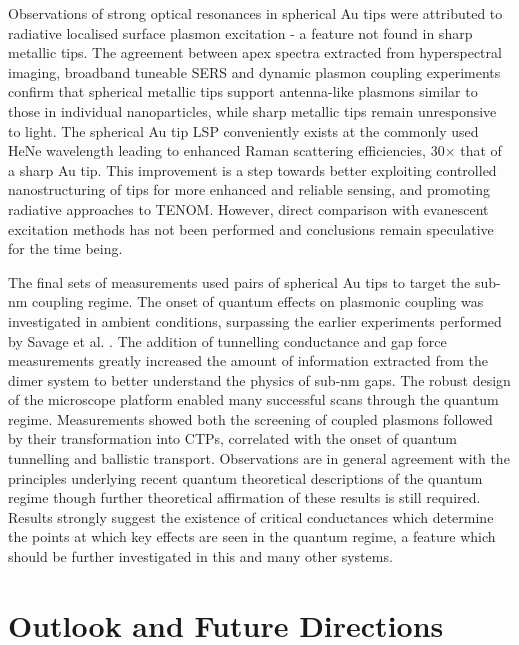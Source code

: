 \documentclass[12pt, a4paper, oneside]{book}
\begin{document}
Observations of strong optical resonances in spherical Au tips were attributed to radiative localised surface plasmon excitation - a feature not found in sharp metallic tips. The agreement between apex spectra extracted from hyperspectral imaging, broadband tuneable SERS and dynamic plasmon coupling experiments confirm that spherical metallic tips support antenna-like plasmons similar to those in individual nanoparticles, while sharp metallic tips remain unresponsive to light. The spherical Au tip LSP conveniently exists at the commonly used HeNe wavelength leading to enhanced Raman scattering efficiencies, 30$\times$ that of a sharp Au tip. This improvement is a step towards better exploiting controlled nanostructuring of tips for more enhanced and reliable sensing, and promoting radiative approaches to TENOM. However, direct comparison with evanescent excitation methods has not been performed and conclusions remain speculative for the time being.

The final sets of measurements used pairs of spherical Au tips to target the sub-nm coupling regime. The onset of quantum effects on plasmonic coupling was investigated in ambient conditions, surpassing the earlier experiments performed by Savage et al. \cite{savage2012}. The addition of tunnelling conductance and gap force measurements greatly increased the amount of information extracted from the dimer system to better understand the physics of sub-nm gaps. The robust design of the microscope platform enabled many successful scans through the quantum regime. Measurements showed both the screening of coupled plasmons followed by their transformation into CTPs, correlated with the onset of quantum tunnelling and ballistic transport. Observations are in general agreement with the principles underlying recent quantum theoretical descriptions of the quantum regime though further theoretical affirmation of these results is still required. Results strongly suggest the existence of critical conductances which determine the points at which key effects are seen in the quantum regime, a feature which should be further investigated in this and many other systems.

\section{Outlook and Future Directions}
\end{document}
